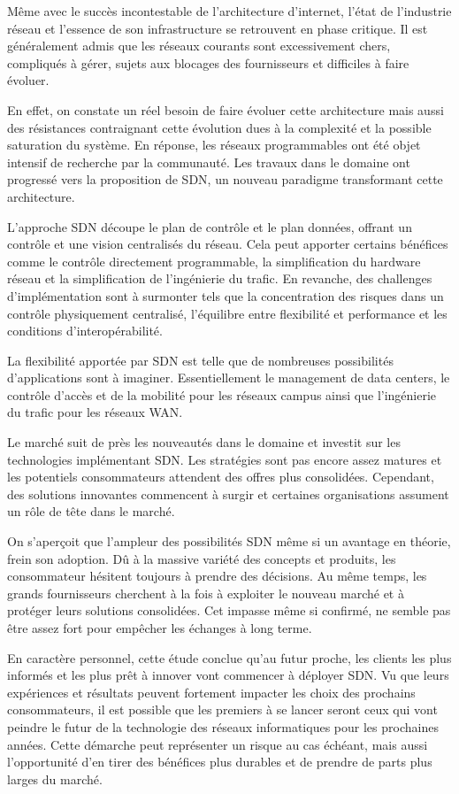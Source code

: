 
Même avec le succès incontestable de l'architecture d'internet, l'état de l'industrie réseau et l'essence de son infrastructure se retrouvent en phase critique. Il est généralement admis que les réseaux courants sont excessivement chers, compliqués à gérer, sujets aux blocages des fournisseurs et difficiles à faire évoluer. 

En effet, on constate un réel besoin de faire évoluer cette architecture mais aussi des résistances contraignant cette évolution dues à la complexité et la possible saturation du système. En réponse, les réseaux programmables ont été objet intensif de recherche par la communauté. Les travaux dans le domaine ont progressé vers la proposition de SDN, un nouveau paradigme transformant cette architecture.

L'approche SDN découpe le plan de contrôle et le plan données, offrant un contrôle et une vision centralisés du réseau. Cela peut apporter certains bénéfices comme le contrôle directement programmable, la simplification du hardware réseau et la simplification de l'ingénierie du trafic. En revanche, des challenges d'implémentation sont à surmonter tels que la concentration des risques dans un contrôle physiquement centralisé, l'équilibre entre flexibilité et performance et les conditions d'interopérabilité.

La flexibilité apportée par SDN est telle que de nombreuses possibilités d'applications sont à imaginer. Essentiellement le management de data centers, le contrôle d'accès et de la mobilité pour les réseaux campus ainsi que  l'ingénierie du trafic pour les réseaux WAN.

Le marché suit de près les nouveautés dans le domaine et investit sur les technologies implémentant SDN. Les stratégies sont pas encore assez matures et les potentiels consommateurs attendent des offres plus consolidées. Cependant, des solutions innovantes commencent à surgir et certaines organisations assument un rôle de tête dans le marché.

On s'aperçoit que l'ampleur des possibilités SDN même si un avantage en théorie, frein son adoption. Dû à la massive variété des concepts et produits, les consommateur hésitent toujours à prendre des décisions. Au même temps, les grands fournisseurs cherchent à la fois à exploiter le nouveau marché et à protéger leurs solutions consolidées. Cet impasse même si confirmé, ne semble pas être assez fort pour empêcher les échanges à long terme.

En caractère personnel, cette étude conclue qu'au futur proche, les clients les plus informés et les plus prêt à innover vont commencer à déployer SDN. Vu que leurs expériences et résultats peuvent fortement impacter les choix des prochains consommateurs, il est possible que les premiers à se lancer seront ceux qui vont peindre le futur de la technologie des réseaux informatiques pour les prochaines années. Cette démarche peut représenter un risque au cas échéant, mais aussi l'opportunité d'en tirer des bénéfices plus durables et de prendre de parts plus larges du marché.